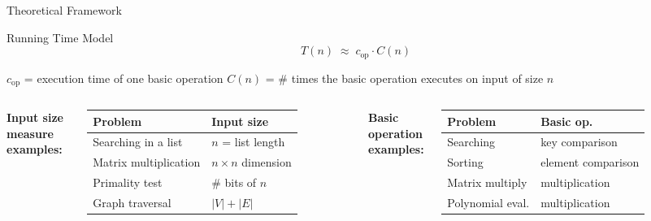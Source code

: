 \documentclass[aspectratio=169]{beamer}
\begin{document}
\begin{frame}[shrink=12]{Theoretical Framework}
  \begin{block}{Running Time Model}
    \[
      T(n) \;\approx\; c_{\mathrm{op}} \cdot C(n)
    \]
    \begin{center}
      \small
      $c_{\mathrm{op}}$ = execution time of one basic operation \quad
      $C(n)$ = \# times the basic operation executes on input of size $n$
    \end{center}
  \end{block}
  \vspace{0.4em}
  \begin{columns}[T]
      \textbf{Input size measure examples:}
      \vspace{0.2em}

      \begin{tabular}{ll}
        \toprule
        \textbf{Problem} & \textbf{Input size} \\
        \midrule
        Searching in a list & $n$ = list length \\
        Matrix multiplication & $n\times n$ dimension \\
        Primality test & \# bits of $n$ \\
        Graph traversal & $|V| + |E|$ \\
        \bottomrule
      \end{tabular}
      \textbf{Basic operation examples:}
      \vspace{0.2em}

      \begin{tabular}{ll}
        \toprule
        \textbf{Problem} & \textbf{Basic op.} \\
        \midrule
        Searching & key comparison \\
        Sorting & element comparison \\
        Matrix multiply & multiplication \\
        Polynomial eval. & multiplication \\
        \bottomrule
      \end{tabular}
  \end{columns}
\end{frame}
\end{document}
